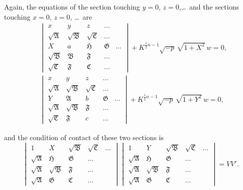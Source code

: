 \documentclass[11pt]{article}
\begin{document}
Again, the equations of the section touching $y=0$, $z=0$,\ldots\ and the sections touching $x=0$, $z=0$, \ldots\ are
\begin{align*}
&\begin{vmatrix}
x & y & z & \ldots \\
\sqrt{\mathfrak{A}} & \sqrt{\mathfrak{B}} & \sqrt{\mathfrak{C}} & \ldots \\
X & a & \mathfrak{H} & \mathfrak{G} & \ldots \\
\sqrt{\mathfrak{B}} & \mathfrak{B} & \mathfrak{F} & \ldots \\
\sqrt{\mathfrak{C}} & \mathfrak{F} & \mathfrak{C} & \ldots
\end{vmatrix}
+ K^{\frac{1}{2}n-1}\sqrt{-p}\,\sqrt{1+X^2}\,w = 0,\\
&\begin{vmatrix}
x & y & z & \ldots \\
\sqrt{\mathfrak{A}} & \sqrt{\mathfrak{B}} & \sqrt{\mathfrak{C}} & \ldots \\
Y & \mathfrak{A} & b & \mathfrak{G} & \ldots \\
\sqrt{\mathfrak{A}} & \sqrt{\mathfrak{B}} & \mathfrak{F} & \ldots \\
\sqrt{\mathfrak{C}} & \mathfrak{F} & c & \ldots
\end{vmatrix}
+ K^{\frac{1}{2}n-1}\sqrt{-p}\,\sqrt{1+Y^2}\,w = 0,
\end{align*}

\newpage
\setcounter{page}{86}

and the condition of contact of these two sections is
\[
\begin{vmatrix}
1 & X & \sqrt{\mathfrak{B}} & \sqrt{\mathfrak{C}} & \ldots \\
\sqrt{\mathfrak{A}} & \mathfrak{H} & \mathfrak{G} & \ldots \\
\sqrt{\mathfrak{A}} & \sqrt{\mathfrak{B}} & \mathfrak{F} & \ldots \\
\sqrt{\mathfrak{A}} & \mathfrak{G} & \mathfrak{C} & \ldots
\end{vmatrix}
\begin{vmatrix}
1 & Y & \sqrt{\mathfrak{B}} & \sqrt{\mathfrak{C}} & \ldots \\
\sqrt{\mathfrak{A}} & \mathfrak{H} & \mathfrak{G} & \ldots \\
\sqrt{\mathfrak{A}} & \sqrt{\mathfrak{B}} & \mathfrak{F} & \ldots \\
\sqrt{\mathfrak{A}} & \mathfrak{G} & \mathfrak{C} & \ldots
\end{vmatrix}
= VV'.
\]
\end{document}
